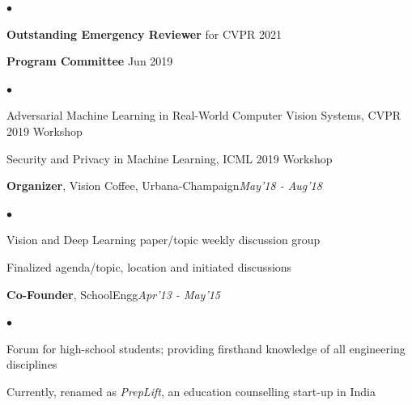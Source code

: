 \documentclass[margin,line]{res}
\newenvironment{list2}{
  \begin{list}{$\bullet$}{%
      \setlength{\itemsep}{0in}
      \setlength{\parsep}{0in} \setlength{\parskip}{0in}
      \setlength{\topsep}{0in} \setlength{\partopsep}{0in} 
      \setlength{\leftmargin}{0.2in}}}{\end{list}}
\begin{document}
\begin{resume}
\begin{list2}
\item {\bf Outstanding Emergency Reviewer} for CVPR 2021
\end{list2}\vspace*{-0.05in} 
{\bf Program Committee} {\hfill Jun 2019}\vspace*{-0.15in}\\
\begin{list2}
\item Adversarial Machine Learning in Real-World Computer Vision Systems, CVPR 2019 Workshop
\item Security and Privacy in Machine Learning, ICML 2019 Workshop
\end{list2}\vspace*{-0.05in} 
{\bf Organizer}, Vision Coffee, Urbana-Champaign{\hfill \em May'18 - Aug'18}\vspace*{-0.15in}\\
\begin{list2}
\item Vision and Deep Learning paper/topic weekly discussion group
\item Finalized agenda/topic, location and initiated discussions 
\end{list2}\vspace*{-0.05in} 
{\bf Co-Founder}, SchoolEngg{\hfill \em Apr'13 - May'15}\vspace*{-0.15in}\\
\begin{list2}
\item Forum for high-school students; providing firsthand knowledge of all engineering disciplines
\item Currently, renamed as {\em PrepLift}, an education counselling start-up in India
\end{list2}

\end{resume}
\end{document}
